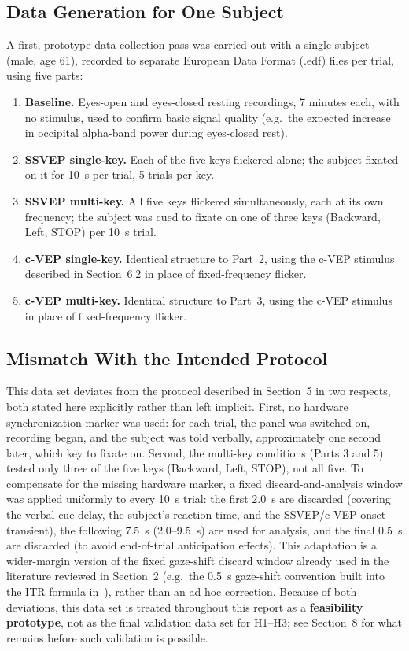 \documentclass[11pt]{article}
\begin{document}
\subsection{Data Generation for One Subject}

A first, prototype data-collection pass was carried out with a single subject (male, age 61), recorded to separate European Data Format (.edf) files per trial, using five parts:

\begin{enumerate}
  \item \textbf{Baseline.} Eyes-open and eyes-closed resting recordings, 7 minutes each, with no stimulus, used to confirm basic signal quality (e.g.\ the expected increase in occipital alpha-band power during eyes-closed rest).
  \item \textbf{SSVEP single-key.} Each of the five keys flickered alone; the subject fixated on it for 10~s per trial, 5 trials per key.
  \item \textbf{SSVEP multi-key.} All five keys flickered simultaneously, each at its own frequency; the subject was cued to fixate on one of three keys (Backward, Left, STOP) per 10~s trial.
  \item \textbf{c-VEP single-key.} Identical structure to Part~2, using the c-VEP stimulus described in Section~6.2 in place of fixed-frequency flicker.
  \item \textbf{c-VEP multi-key.} Identical structure to Part~3, using the c-VEP stimulus in place of fixed-frequency flicker.
\end{enumerate}

\subsection{Mismatch With the Intended Protocol}

This data set deviates from the protocol described in Section~5 in two respects, both stated here explicitly rather than left implicit. First, no hardware synchronization marker was used: for each trial, the panel was switched on, recording began, and the subject was told verbally, approximately one second later, which key to fixate on. Second, the multi-key conditions (Parts 3 and 5) tested only three of the five keys (Backward, Left, STOP), not all five. To compensate for the missing hardware marker, a fixed discard-and-analysis window was applied uniformly to every 10~s trial: the first 2.0~s are discarded (covering the verbal-cue delay, the subject's reaction time, and the SSVEP/c-VEP onset transient), the following 7.5~s (2.0--9.5~s) are used for analysis, and the final 0.5~s are discarded (to avoid end-of-trial anticipation effects). This adaptation is a wider-margin version of the fixed gaze-shift discard window already used in the literature reviewed in Section~2 (e.g.\ the 0.5~s gaze-shift convention built into the ITR formula in~\cite{chen2015pnas}), rather than an ad hoc correction. Because of both deviations, this data set is treated throughout this report as a \textbf{feasibility prototype}, not as the final validation data set for H1--H3; see Section~8 for what remains before such validation is possible.
\end{document}
